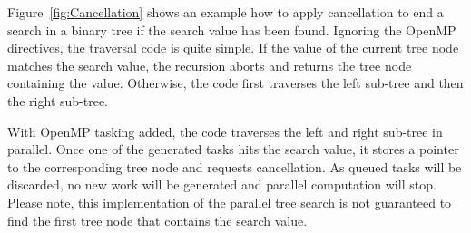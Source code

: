 Figure~\ref{fig:Cancellation} shows an example how to apply cancellation to end a search in a binary tree if the search value has been found.
Ignoring the OpenMP directives, the traversal code is quite simple.
If the value of the current tree node matches the search value, the recursion aborts and returns the tree node containing the value.
Otherwise, the code first traverses the left sub-tree and then the right sub-tree.

With OpenMP tasking added, the code traverses the left and right sub-tree in parallel.
Once one of the generated tasks hits the search value, it stores a pointer to the corresponding tree node and requests cancellation.
As queued tasks will be discarded, no new work will be generated and parallel computation will stop.
Please note, this implementation of the parallel tree search is not guaranteed to find the first tree node that contains the search value.

